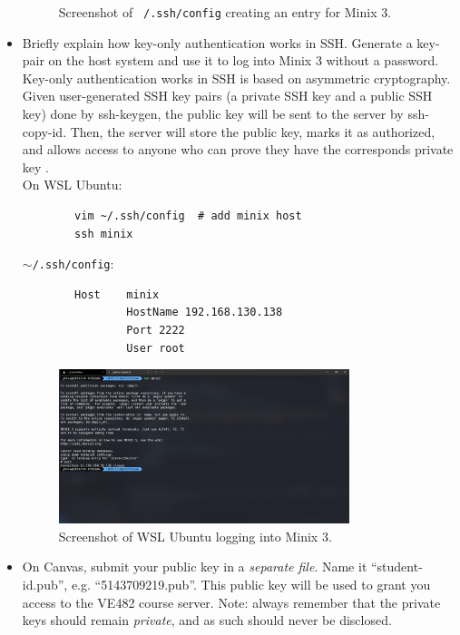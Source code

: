 \documentclass[a4paper]{article}
\begin{document}
\begin{itemize}
\begin{figure}[H]
        \caption{Screenshot of \texttt{~/.ssh/config} creating an entry for Minix 3.}
    \end{figure}
    \item Briefly explain how key-only authentication works in SSH. Generate a key-pair on the host system and use it to log into Minix 3 without a password.
    Key-only authentication works in SSH is based on asymmetric cryptography. Given user-generated SSH key pairs (a private SSH key and a public SSH key) done by ssh-keygen, the public key will be sent to the server by ssh-copy-id. Then, the server will store the public key, marks it as authorized, and allows access to anyone who can prove they have the corresponds private key \cite{ssh}.\\
    On WSL Ubuntu:
    \begin{verbatim}
        vim ~/.ssh/config  # add minix host
        ssh minix
    \end{verbatim}
    \texttt{$\sim$/.ssh/config}:
    \begin{verbatim}
        Host    minix
                HostName 192.168.130.138
                Port 2222
                User root
    \end{verbatim}
    \begin{figure}[H]
        \centering
        \includegraphics[width=0.8\textwidth]{3.png}
        \caption{Screenshot of WSL Ubuntu logging into Minix 3.}
    \end{figure}
    \item On Canvas, submit your public key in a \textit{separate file}. Name it “student-id.pub”, e.g. “5143709219.pub”. This public key will be used to grant you access to the VE482 course server. Note: always remember that the private keys should remain \textit{private}, and as such should never be disclosed.
\end{itemize}
\end{document}
